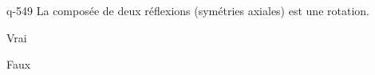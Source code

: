 \begin{truefalse}{q-549}
La composée de deux réflexions (symétries axiales) est une rotation.
\item Vrai
\item* Faux
\end{truefalse}

